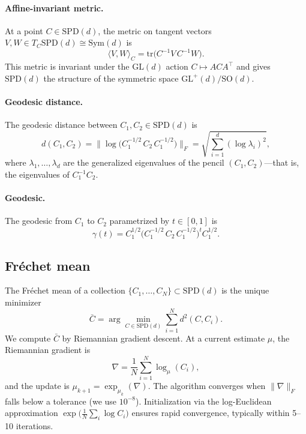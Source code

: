 \documentclass[preprint,12pt]{elsarticle}
\newcommand{\SPD}{\mathrm{SPD}}
\newcommand{\Sym}{\mathrm{Sym}}
\newcommand{\tr}{\mathrm{tr}}
\newcommand{\GL}{\mathrm{GL}}
\newcommand{\SO}{\mathrm{SO}}
\newcommand{\Cbar}{\bar{C}}
\begin{document}
\paragraph{Affine-invariant metric.}
At a point $C \in \SPD(d)$, the metric on tangent vectors $V, W \in T_C\SPD(d) \cong \Sym(d)$ is
\begin{equation}\label{eq:metric}
\langle V, W \rangle_C = \tr\bigl(C^{-1} V \, C^{-1} W\bigr).
\end{equation}
This metric is invariant under the $\GL(d)$ action $C \mapsto A C A^\top$ and gives $\SPD(d)$ the structure of the symmetric space $\GL^+(d)/\SO(d)$.

\paragraph{Geodesic distance.}
The geodesic distance between $C_1, C_2 \in \SPD(d)$ is
\begin{equation}\label{eq:geodist}
d(C_1, C_2) = \bigl\| \log\bigl(C_1^{-1/2}\, C_2\, C_1^{-1/2}\bigr) \bigr\|_F = \sqrt{\sum_{i=1}^d (\log \lambda_i)^2},
\end{equation}
where $\lambda_1, \ldots, \lambda_d$ are the generalized eigenvalues of the pencil $(C_1, C_2)$---that is, the eigenvalues of $C_1^{-1} C_2$.

\paragraph{Geodesic.}
The geodesic from $C_1$ to $C_2$ parametrized by $t \in [0,1]$ is
\begin{equation}\label{eq:geodesic}
\gamma(t) = C_1^{1/2}\bigl(C_1^{-1/2}\, C_2\, C_1^{-1/2}\bigr)^t C_1^{1/2}.
\end{equation}

\subsection{Fr\'{e}chet mean}\label{sec:frechet}

The Fr\'{e}chet mean of a collection $\{C_1, \ldots, C_N\} \subset \SPD(d)$ is the unique minimizer
\begin{equation}\label{eq:frechet}
\Cbar = \arg\min_{C \in \SPD(d)} \sum_{i=1}^N d^2(C, C_i).
\end{equation}
We compute $\Cbar$ by Riemannian gradient descent.
At a current estimate $\mu$, the Riemannian gradient is
\begin{equation}
\nabla = \frac{1}{N} \sum_{i=1}^N \log_\mu(C_i),
\end{equation}
and the update is $\mu_{k+1} = \exp_{\mu_k}(\nabla)$.
The algorithm converges when $\|\nabla\|_F$ falls below a tolerance (we use $10^{-8}$).
Initialization via the log-Euclidean approximation $\exp\!\bigl(\frac{1}{N}\sum_i \log C_i\bigr)$ ensures rapid convergence, typically within 5--10 iterations.
\end{document}

